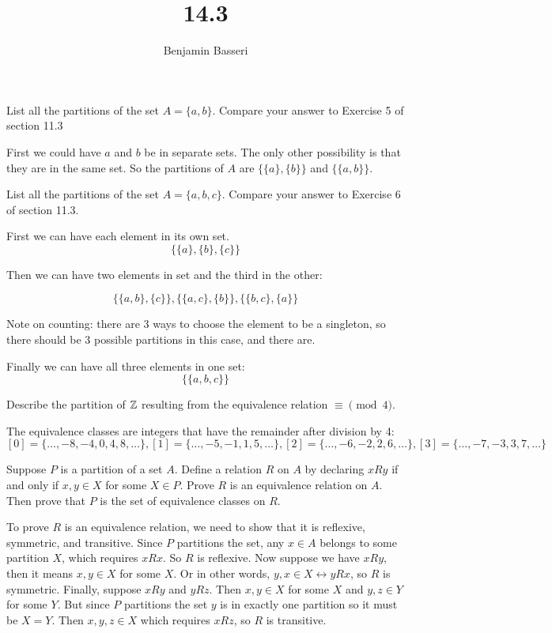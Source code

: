 \documentclass{article}
\title{14.3}
\author{Benjamin Basseri}
\date{} %
\begin{document}
\maketitle

\begin{problem}
List all the partitions of the set $A = \{a, b\}$. Compare your answer to Exercise 5 of section 11.3
\end{problem}

First we could have $a$ and $b$ be in separate sets. The only other possibility is that they are in the same set. So the partitions of $A$ are $\{\{a\}, \{b\}\}$ and $\{\{a, b\}\}$.

\begin{problem}
List all the partitions of the set $A = \{a, b, c\}$. Compare your answer to Exercise 6 of section 11.3.
\end{problem}

First we can have each element in its own set.
$$\{\{a\}, \{b\}, \{c\}\}$$

Then we can have two elements in set and the third in the other:

$$\{\{a, b\}, \{c\}\}, \{\{a, c\}, \{b\}\}, \{\{b, c\}, \{a\}\}$$

Note on counting: there are 3 ways to choose the element to be a singleton, so there should be 3 possible partitions in this case, and there are.

Finally we can have all three elements in one set:
$$\{\{a, b, c\}\}$$

\begin{problem}
Describe the partition of $\mathbb{Z}$ resulting from the equivalence relation $\equiv \pmod{4}$.
\end{problem}

The equivalence classes are integers that have the remainder after division by 4:
$$[0] = \{\ldots, -8, -4, 0, 4, 8, \ldots\}, [1] = \{\ldots, -5, -1, 1, 5, \ldots\}, [2] = \{\ldots, -6, -2, 2, 6, \ldots\}, [3] = \{\ldots, -7, -3, 3, 7, \ldots\}$$

\begin{problem}
Suppose $P$ is a partition of a set $A$. Define a relation $R$ on $A$ by declaring $xRy$ if and only if $x, y \in X$ for some $X \in P$. Prove $R$ is an equivalence relation on $A$. Then prove that $P$ is the set of equivalence classes on $R$.
\end{problem}

To prove $R$ is an equivalence relation, we need to show that it is reflexive, symmetric, and transitive. Since $P$ partitions the set, any $x \in A$ belongs to some partition $X$, which requires $xRx$. So $R$ is reflexive. Now suppose we have $xRy$, then it means $x, y \in X$ for some $X$. Or in other words, $y, x \in X \leftrightarrow yRx$, so $R$ is symmetric. Finally, suppose $xRy$ and $yRz$. Then $x, y \in X$ for some $X$ and $y, z \in Y$ for some $Y$. But since $P$ partitions the set $y$ is in exactly one partition so it must be $X = Y$. Then $x, y, z \in X$ which requires $xRz$, so $R$ is transitive.
\end{document}
